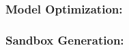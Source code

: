 \documentclass[sigconf]{acmart}
\theoremstyle{plain}
\theoremstyle{remark}
\begin{document}
\subsubsection{Model Optimization:}

\subsubsection{Sandbox Generation:}




%
%
%
%
%
%
\end{document}
